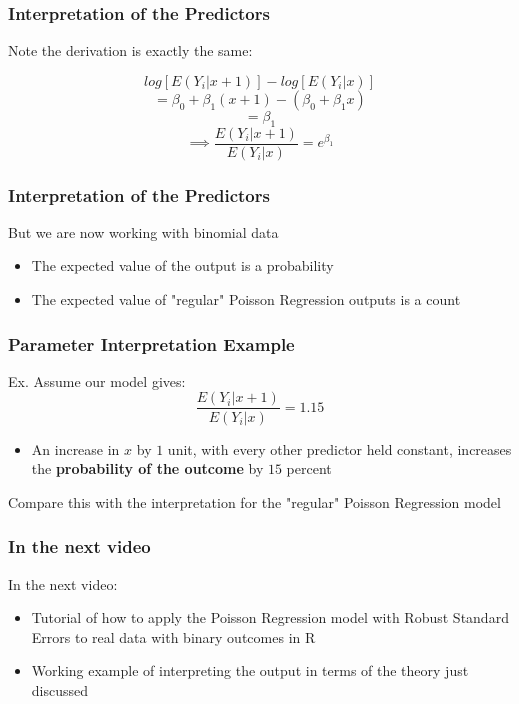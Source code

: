 \documentclass{beamer}
\begin{document}
\begin{frame}[fragile]\frametitle{Interpretation of the Predictors}

	Note the derivation is exactly the same:
	
	$$ log[E(Y_i|x+1)] - log[E(Y_i|x)] $$
	$$ = \beta_0 + \beta_1 (x + 1) - (\beta_0 + \beta_1 x)$$ 
	$$ = \beta_1 $$
	$$ \implies \frac{E(Y_i|x+1)}{E(Y_i|x)} = e^{\beta_1} $$
	
\end{frame}



\begin{frame}[fragile]\frametitle{Interpretation of the Predictors}

	But we are now working with binomial data
	\begin{itemize}
	
		\item The expected value of the output is a probability
		
		\item The expected value of "regular" Poisson Regression outputs is a count 
	
	\end{itemize}
	
\end{frame}



\begin{frame}[fragile]\frametitle{Parameter Interpretation Example}
	
	Ex. Assume our model gives: $$ \frac{E(Y_i|x+1)}{E(Y_i|x)} = 1.15 $$
	
	\begin{itemize}
		
		\item An increase in $x$ by $1$ unit, with every other predictor held constant, increases the \textbf{probability of the outcome} by $15$ percent
	
	\end{itemize}
	
	Compare this with the interpretation for the "regular" Poisson Regression model
	
\end{frame}



\begin{frame}[fragile]\frametitle{In the next video}
	
	In the next video:	
	
	\begin{itemize}
	
		\item Tutorial of how to apply the Poisson Regression model with Robust Standard Errors to real data with binary outcomes in R
		
		\item Working example of interpreting the output in terms of the theory just discussed
		
	\end{itemize}
	
\end{frame}
\end{document}
